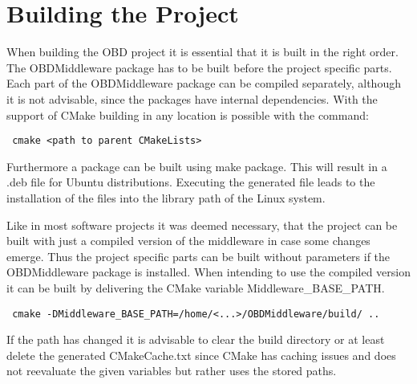 \section{Building the Project}

When building the OBD project it is essential that it is built in the right order. 
The OBDMiddleware package has to be built before the project specific parts. 
Each part of the OBDMiddleware package can be compiled separately, although it is not advisable, 
since the packages have internal dependencies. 
With the support of CMake building in any location is possible with the command:

\begin{verbatim}
 cmake <path to parent CMakeLists>
\end{verbatim}

Furthermore a package can be built using make package. This will result in a .deb file for Ubuntu distributions. 
Executing the generated file leads to the installation of the files into the library path of the Linux system. 

Like in most software projects it was deemed necessary, that the project can be built with just a compiled version 
of the middleware in case some changes emerge. Thus the project specific parts can be built without parameters 
if the OBDMiddleware package is installed. When intending to use the compiled version it can be built by delivering 
the CMake variable Middleware\_BASE\_PATH.

\begin{verbatim}
 cmake -DMiddleware_BASE_PATH=/home/<...>/OBDMiddleware/build/ .. 
\end{verbatim}

If the path has changed it is advisable to clear the build directory or at least delete the generated CMakeCache.txt 
since CMake has caching issues and does not reevaluate the given variables but rather uses the stored paths. 



